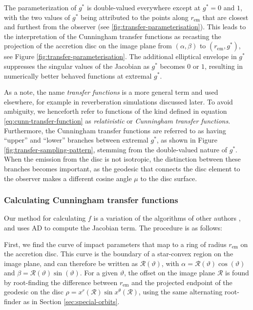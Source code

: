 \documentclass[fleqn,usenatbib]{mnras}
\newcommand{\rhoem}{r_\text{em}}
\begin{document}
The parameterization of $g^\ast$ is double-valued everywhere except at $g^\ast =
0$ and $1$, with the two values of $g^\ast$ being attributed to the points along
$\rhoem$ that are closest and furthest from the observer (see
\ref{fig:transfer-parameterisation}). This leads to the interpretation of the
Cunningham transfer functions as recasting the projection of the accretion disc
on the image plane from $(\alpha, \beta)$ to $(\rhoem, g^\ast)$, see Figure
\ref{fig:transfer-parameterisation}. The additional elliptical envelope in
$g^\ast$ suppresses the singular values of the Jacobian as $g^\ast$ becomes $0$
or $1$, resulting in numerically better behaved functions at extremal $g^\ast$.

As a note, the name \emph{transfer functions} is a more general term and used
elsewhere, for example in reverberation simulations discussed later. To avoid
ambiguity, we henceforth refer to functions of the kind defined in equation
\eqref{eq:cunn-transfer-function} as \emph{relativistic} or \emph{Cunningham
transfer functions}. Furthermore, the Cunningham transfer functions are referred
to as having ``upper'' and ``lower'' branches between extremal $g^\ast$, as
shown in Figure \ref{fig:transfer-sampling-pattern}, stemming from the
double-valued nature of $g^\ast$. When the emission from the disc is not
isotropic, the distinction between these branches becomes important, as the
geodesic that connects the disc element to the observer makes a different cosine
angle $\mu$ to the disc surface.

\subsubsection{Calculating Cunningham transfer functions}

Our method for calculating $f$ is a variation of the algorithms of other authors
\citep{speith_photon_1995,bambi_testing_2017,abdikamalov_public_2019}, and uses
AD to compute the Jacobian term. The procedure is as follows:

First, we find the curve of impact parameters that map to a ring of radius
$\rhoem$ on the accretion disc. This curve is the boundary of a star-convex
region on the image plane, and can therefore be written as
$\mathcal{R}(\vartheta)$, with $\alpha = \mathcal{R}(\vartheta) \cos(\vartheta)$
and $\beta = \mathcal{R}(\vartheta) \sin(\vartheta)$. For a given $\vartheta$,
the offset on the image plane $\mathcal{R}$ is found by root-finding the
difference between $\rhoem$ and the projected endpoint of the geodesic on
the disc $\rho = x^r (\mathcal{R}) \sin x^\theta(\mathcal{R})$, using the same
alternating root-finder as in Section \ref{sec:special-orbits}.
\end{document}

